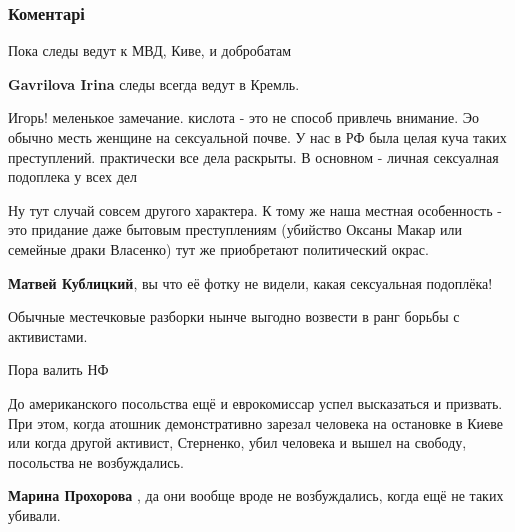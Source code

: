  
 
 
 
 
\subsubsection{Коментарі}
\label{sec:05_11_2018.fb.lesev_igor.1.ekaterina_gandzjuk.cmt}

\begin{itemize} %
Пока следы ведут к МВД, Киве, и добробатам

\textbf{Gavrilova Irina} следы всегда ведут в Кремль.


Игорь! меленькое замечание. кислота - это не способ привлечь внимание. Эо
обычно месть женщине на сексуальной почве. У нас в РФ была целая куча таких
преступлений. практически все дела раскрыты. В основном - личная сексуалная
подоплека у всех дел

\begin{itemize} %
Ну тут случай совсем другого характера. К тому же наша местная особенность - это придание даже бытовым преступлениям (убийство Оксаны Макар или семейные драки Власенко) тут же приобретают политический окрас.

\textbf{Матвей Кублицкий}, вы что её фотку не видели, какая сексуальная подоплёка!
\end{itemize} %

Обычные местечковые разборки нынче выгодно возвести в ранг борьбы с активистами.

Пора валить НФ


До американского посольства ещё и еврокомиссар успел высказаться и призвать.
При этом, когда атошник демонстративно зарезал человека на остановке в Киеве
или когда другой активист, Стерненко, убил человека и вышел на свободу,
посольства не возбуждались.

\begin{itemize} %
\textbf{Марина Прохорова} , да они вообще вроде не возбуждались, когда ещё не таких убивали.
\end{itemize} %


\end{itemize}
